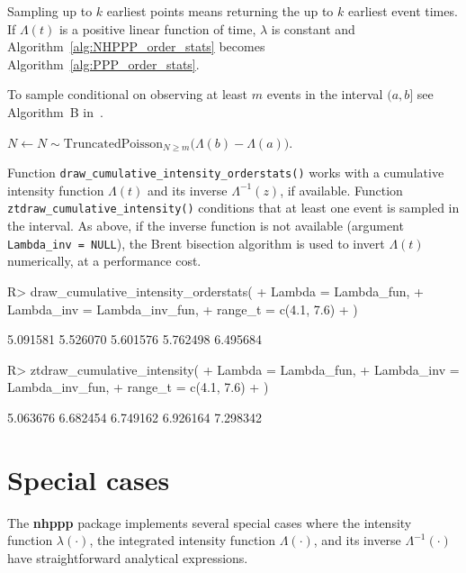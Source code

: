 \documentclass[10pt,letterpaper]{article}
\newcommand{\pkg}[1]{{\bf #1}}
\newcommand{\fct}[1]{\texttt{#1()}}
\begin{document}
Sampling up to $k$ earliest points means returning the up to $k$ earliest event times. If $\Lambda(t)$ is a positive linear function of time, $\lambda$ is constant and Algorithm~\ref{alg:NHPPP_order_stats} becomes Algorithm~\ref{alg:PPP_order_stats}.

To sample conditional on observing at least $m$ events in the interval $(a, b]$ see  Algorithm~B in~.%
\begin{center}
$N \gets N \sim \mathrm{TruncatedPoisson}_{N \ge m}\big(\Lambda(b) - \Lambda(a)\big)$.
\end{center}


Function \fct{draw\_cumulative\_intensity\_orderstats} works with a cumulative intensity function $\Lambda(t)$ and its inverse $\Lambda^{-1}(z)$, if available.
Function \fct{ztdraw\_cumulative\_intensity} conditions that at least one event is sampled in the interval. As above, if the inverse function is not available (argument \texttt{Lambda\_inv = NULL}), the Brent bisection algorithm is used to invert $\Lambda(t)$ numerically, at a performance cost.

\begin{Schunk}
\begin{Sinput}
R> draw_cumulative_intensity_orderstats(
+    Lambda = Lambda_fun,
+    Lambda_inv = Lambda_inv_fun,
+    range_t = c(4.1, 7.6)
+  )
\end{Sinput}
\begin{Soutput}
[1] 5.091581 5.526070 5.601576 5.762498 6.495684
\end{Soutput}
\end{Schunk}

\begin{Schunk}
\begin{Sinput}
R> ztdraw_cumulative_intensity(
+    Lambda = Lambda_fun,
+    Lambda_inv = Lambda_inv_fun,
+    range_t = c(4.1, 7.6)
+  )
\end{Sinput}
\begin{Soutput}
[1] 5.063676 6.682454 6.749162 6.926164 7.298342
\end{Soutput}
\end{Schunk}


\newpage
\section{Special cases}\label{sec:special_cases}

The \pkg{nhppp} package implements several special cases where the intensity function $\lambda(\cdot)$, the integrated intensity function $\Lambda(\cdot)$, and its inverse $\Lambda^{-1}(\cdot)$ have straightforward analytical expressions.
\end{document}
